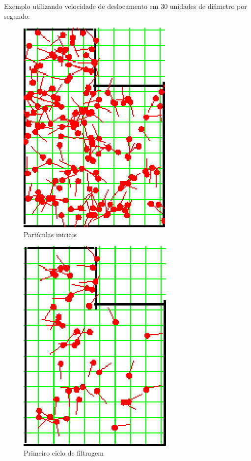 Exemplo utilizando velocidade de deslocamento em 30 unidades de diâmetro por segundo:

\begin{figure}[H]
  \centering
  \includegraphics[scale=1]{figuras/cen3_ex5/1.eps}
  \caption[Partículas Iniciais]{Partículas iniciais}
  \label{img:cen3_ex5_1}
\end{figure}

\begin{figure}[H]
  \centering
  \includegraphics[scale=1]{figuras/cen3_ex5/2.eps}
  \caption[Primeiro Ciclo de Filtragem]{Primeiro ciclo de filtragem}
  \label{img:cen3_ex5_2}
\end{figure}

